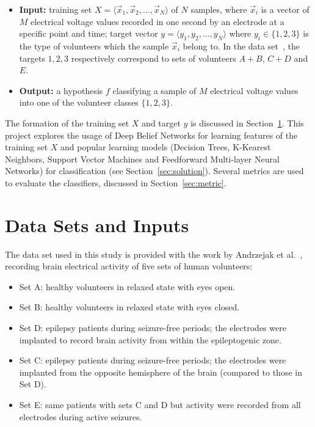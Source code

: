 \documentclass[12pt]{article}
\newcommand{\myvec}[1]{\vec{#1}}
\begin{document}
\begin{itemize}
\item \textbf{Input:} training set $X = \langle \myvec{x}_1, \myvec{x}_2, ..., \myvec{x}_N\rangle$ of $N$ samples, where $\myvec{x}_i$ is a vector of $M$ electrical voltage values recorded in one second by an electrode at a specific point and time; target vector $y = \langle y_1, y_2, ..., y_N \rangle$ where $y_i \in \{1, 2, 3\}$ is the type of volunteers which the sample $\myvec{x}_i$ belong to. In the data set~\cite{andrzejak2001indications}, the targets $1, 2, 3$ respectively correspond to sets of volunteers $A + B$, $C + D$ and $E$.
\item \textbf{Output:} a hypothesis $f$ classifying a sample of $M$ electrical voltage values into one of the volunteer classes $\{1, 2, 3\}$.
\end{itemize}

The formation of the training set $X$ and target $y$ is discussed in Section~\ref{sec:data_set}. This project explores the usage of Deep Belief Networks for learning features of the training set $X$ and popular learning models (Decision Trees, K-Kearest Neighbors, Support Vector Machines and Feedforward Multi-layer Neural Networks) for classification (see Section~\ref{sec:solution}). Several metrics are used to evaluate the classifiers, discussed in Section~\ref{sec:metric}.

\section{Data Sets and Inputs}
\label{sec:data_set}
The data set used in this study is provided with the work by Andrzejak et al.~\cite{andrzejak2001indications}, recording brain electrical activity of five sets of human volunteers:
\begin{itemize}
\item Set A: healthy volunteers in relaxed state with eyes open.
\item Set B: healthy volunteers in relaxed state with eyes closed.
\item Set D: epilepsy patients during seizure-free periods; the electrodes were implanted to record brain activity from within the epileptogenic zone.
\item Set C: epilepsy patients during seizure-free periods; the electrodes were implanted from the opposite hemisphere of the brain (compared to those in Set D).
\item Set E: same patients with sets C and D but activity were recorded from all electrodes during active seizures.
\end{itemize}
\end{document}
